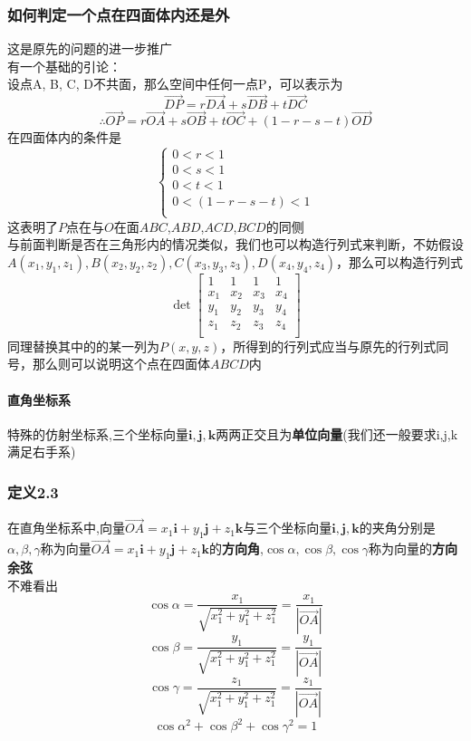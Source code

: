 \documentclass{article}
\newcommand{\ve}{\boldsymbol}
\begin{document}
\begin{CJK}{UTF8}{gkai}
\subsubsection*{如何判定一个点在四面体内还是外}
这是原先的问题的进一步推广\\
有一个基础的引论：\\
设点A, B, C, D不共面，那么空间中任何一点P，可以表示为
\[\overrightarrow{DP}=r\overrightarrow{DA}+s\overrightarrow{DB}+t\overrightarrow{DC}\]
\[\therefore \overrightarrow{OP}=r\overrightarrow{OA}+s\overrightarrow{OB}+t\overrightarrow{OC}+(1-r-s-t)\overrightarrow{OD}\]
在四面体内的条件是
\begin{equation*}
\begin{cases}
0<r<1\\
0<s<1\\
0<t<1\\
0<(1-r-s-t)<1\\
\end{cases}
\end{equation*}
这表明了$P$点在与$O$在面$ABC$,$ABD$,$ACD$,$BCD$的同侧\\
与前面判断是否在三角形内的情况类似，我们也可以构造行列式来判断，不妨假设$A(x_1,y_1,z_1),B(x_2,y_2,z_2),C(x_3,y_3,z_3),D(x_4,y_4,z_4)$，那么可以构造行列式
\[\det\begin{bmatrix}
    1&1&1&1\\
    x_1&x_2&x_3&x_4\\
    y_1&y_2&y_3&y_4\\
    z_1&z_2&z_3&z_4\\
\end{bmatrix}\]
同理替换其中的的某一列为$P(x,y,z)$，所得到的行列式应当与原先的行列式同号，那么则可以说明这个点在四面体$ABCD$内
\paragraph{直角坐标系\\}
特殊的仿射坐标系,三个坐标向量$\ve{i},\ve{j},\ve{k}$两两正交且为\textbf{单位向量}(我们还一般要求i,j,k满足右手系)\\
\subsubsection*{定义2.3}
在直角坐标系中,向量$\overrightarrow{OA}=x_1 \ve{i}+y_1 \ve{j}+z_1 \ve{k}$与三个坐标向量$\ve{i},\ve{j},\ve{k}$的夹角分别是$\alpha,\beta,\gamma$称为向量$\overrightarrow{OA}=x_1 \ve{i}+y_1 \ve{j}+z_1 \ve{k}$的\textbf{方向角},$\cos\alpha,\cos\beta,\cos\gamma$称为向量的\textbf{方向余弦}\\
不难看出\\
\[\cos\alpha=\dfrac{x_1}{\sqrt{x_1^2+y_1^2+z_1^2}}=\dfrac{x_1}{\left|\overrightarrow{OA}\right|}\]
\[\cos\beta=\dfrac{y_1}{\sqrt{x_1^2+y_1^2+z_1^2}}=\dfrac{y_1}{\left|\overrightarrow{OA}\right|}\]
\[\cos\gamma=\dfrac{z_1}{\sqrt{x_1^2+y_1^2+z_1^2}}=\dfrac{z_1}{\left|\overrightarrow{OA}\right|}\]
\[\cos\alpha^2+\cos\beta^2+\cos\gamma^2=1\]


\end{CJK}
\end{document}
